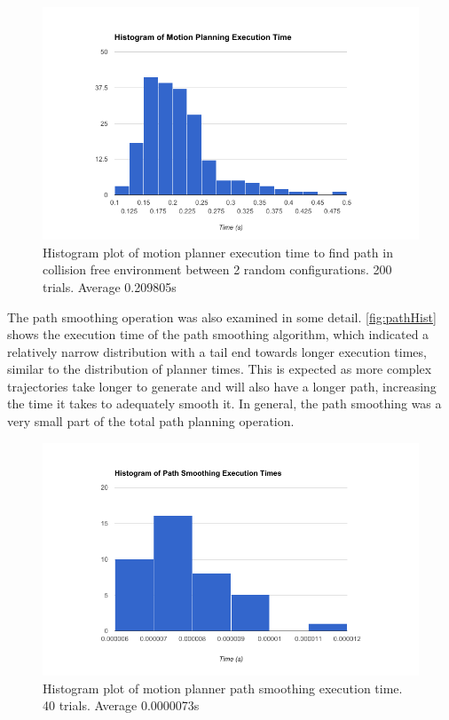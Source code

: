 \documentclass[12pt]{report}
\begin{document}
\begin{figure}[thpb]
	\centering
	\includegraphics[width = 5in]{graphs/planner_hist.png}
    \caption{Histogram plot of motion planner execution time to find path in collision free environment between 2 random configurations. 200 trials. Average 0.209805s}
    \label{fig:plannerHist}
\end{figure}

The path smoothing operation was also examined in some detail. \autoref{fig:pathHist} shows the execution time of the path smoothing algorithm, which indicated a relatively narrow distribution with a tail end towards longer execution times, similar to the distribution of planner times. This is expected as more complex trajectories take longer to generate and will also have a longer path, increasing the time it takes to adequately smooth it. In general, the path smoothing was a very small part of the total path planning operation.

\begin{figure}[thpb]
	\centering
	\includegraphics[width = 5in]{graphs/smoother_hist.png}
    \caption{Histogram plot of motion planner path smoothing execution time. 40 trials. Average 0.0000073s}
    \label{fig:pathHist}
\end{figure}
\end{document}
